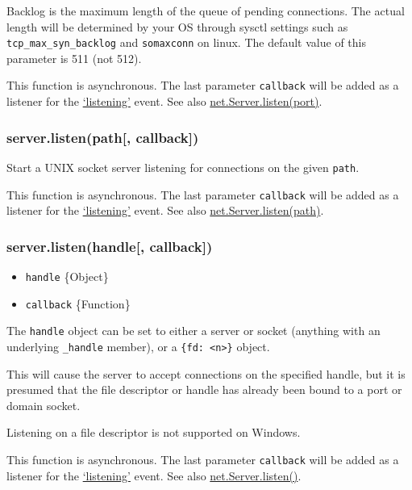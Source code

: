 Backlog is the maximum length of the queue of pending connections. The
actual length will be determined by your OS through sysctl settings such
as \texttt{tcp\_max\_syn\_backlog} and \texttt{somaxconn} on linux. The
default value of this parameter is 511 (not 512).

This function is asynchronous. The last parameter \texttt{callback} will
be added as a listener for the
\href{net.html\#net_event_listening}{`listening'} event. See also
\href{net.html\#net_server_listen_port_host_backlog_callback}{net.Server.listen(port)}.

\subsubsection{server.listen(path{[},
callback{]})}\label{server.listenpath-callback}

Start a UNIX socket server listening for connections on the given
\texttt{path}.

This function is asynchronous. The last parameter \texttt{callback} will
be added as a listener for the
\href{net.html\#net_event_listening}{`listening'} event. See also
\href{net.html\#net_server_listen_path_callback}{net.Server.listen(path)}.

\subsubsection{server.listen(handle{[},
callback{]})}\label{server.listenhandle-callback}

\begin{itemize}
\itemsep1pt\parskip0pt
\item
  \texttt{handle} \{Object\}
\item
  \texttt{callback} \{Function\}
\end{itemize}

The \texttt{handle} object can be set to either a server or socket
(anything with an underlying \texttt{\_handle} member), or a
\texttt{\{fd:\ \textless{}n\textgreater{}\}} object.

This will cause the server to accept connections on the specified
handle, but it is presumed that the file descriptor or handle has
already been bound to a port or domain socket.

Listening on a file descriptor is not supported on Windows.

This function is asynchronous. The last parameter \texttt{callback} will
be added as a listener for the
\href{net.html\#event_listening_}{`listening'} event. See also
\href{net.html\#net_server_listen_handle_callback}{net.Server.listen()}.

